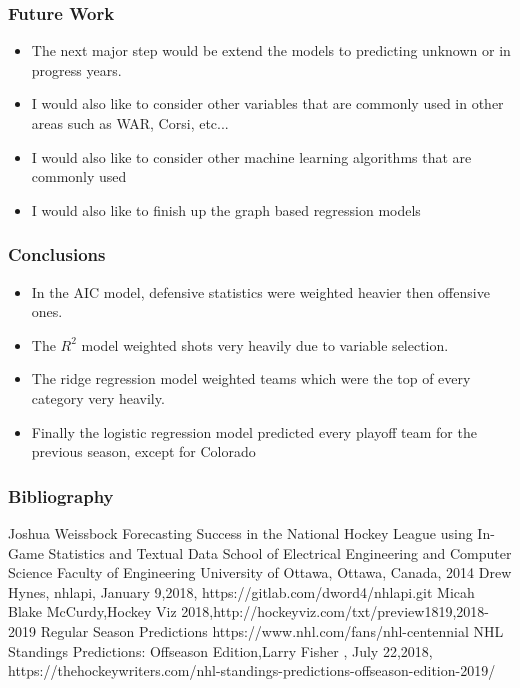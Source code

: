 \documentclass{beamer}
\begin{document}
\begin{frame}
	\frametitle{Future Work}
	 \begin{itemize}
	 \item The next major step would be extend the models to predicting unknown or in progress years. 
	 \item I would also like to consider other variables that are commonly used in other areas such as WAR, Corsi, etc... 
	 \item I would also like to consider other machine learning algorithms that are commonly used
	 \item I would also like to finish up the graph based regression models
	 \end{itemize}
\end{frame}
\begin{frame}
	\frametitle{Conclusions}
	\begin{itemize}
		\item In the AIC model, defensive statistics were weighted heavier then offensive ones. 
		\item The $R^2$ model weighted shots very heavily due to variable selection. 
		\item The ridge regression model weighted teams which were the top of every category very heavily. \item Finally the logistic regression model predicted every playoff team for the previous season, except for Colorado
	\end{itemize}
\end{frame}
\begin{frame}
\frametitle{Bibliography}
		Joshua Weissbock Forecasting Success in the
		National Hockey League using
		In-Game Statistics and Textual Data School of Electrical Engineering and Computer Science
		Faculty of Engineering
		University of Ottawa,  Ottawa, Canada, 2014
		{Drew Hynes, nhlapi, January 9,2018, https://gitlab.com/dword4/nhlapi.git}
		Micah Blake McCurdy,Hockey Viz 2018,http://hockeyviz.com/txt/preview1819,2018-2019 Regular Season Predictions
		https://www.nhl.com/fans/nhl-centennial
		NHL Standings Predictions: Offseason Edition,Larry Fisher , July 22,2018, https://thehockeywriters.com/nhl-standings-predictions-offseason-edition-2019/
\end{frame}
\end{document}
